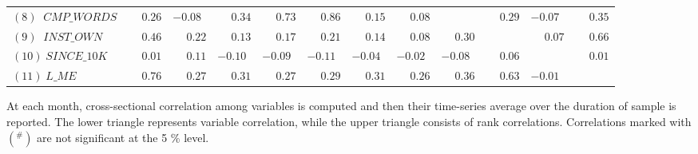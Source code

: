 \begin{landscape}
\begin{table}
\begin{threeparttable}
\begin{tabular}[t]{llllllllllll}
\addlinespace
$(8)\; \;CMP\_WORDS$ & $\phantom{-}0.26$ & $-0.08$ & $\phantom{-}0.34$ & $\phantom{-}0.73$ & $\phantom{-}0.86$ & $\phantom{-}0.15$ & $\phantom{-}0.08$ &  & $\phantom{-}0.29$ & $-0.07$ & $\phantom{-}0.35$\\
\addlinespace
$(9)\; \;INST\_OWN$ & $\phantom{-}0.46$ & $\phantom{-}0.22$ & $\phantom{-}0.13$ & $\phantom{-}0.17$ & $\phantom{-}0.21$ & $\phantom{-}0.14$ & $\phantom{-}0.08$ & $\phantom{-}0.30$ &  & $\phantom{-}0.07$ & $\phantom{-}0.66$\\
\addlinespace
$(10)\;SINCE\_10K$ & $\phantom{-}0.01$ & $\phantom{-}0.11$ & $-0.10$ & $-0.09$ & $-0.11$ & $-0.04$ & $-0.02$ & $-0.08$ & $\phantom{-}0.06$ &  & $\phantom{-}0.01$\\
\addlinespace
$(11)\;L\_ME$ & $\phantom{-}0.76$ & $\phantom{-}0.27$ & $\phantom{-}0.31$ & $\phantom{-}0.27$ & $\phantom{-}0.29$ & $\phantom{-}0.31$ & $\phantom{-}0.26$ & $\phantom{-}0.36$ & $\phantom{-}0.63$ & $-0.01$ & \\
\bottomrule
\end{tabular}
\begin{tablenotes}
\item At each month, cross-sectional correlation among variables is computed and then their time-series average over the duration of sample is reported. The lower triangle represents variable correlation, while the upper triangle consists of rank correlations. Correlations marked with $(\phantom{}^\#)$ are not significant at the 5 \% level.
\end{tablenotes}
\end{threeparttable}
\end{table}
\end{landscape}
\restoregeometry